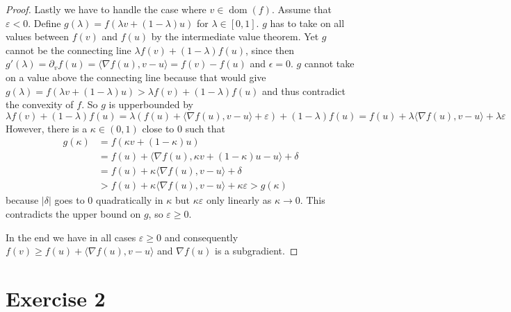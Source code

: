 \documentclass[10pt,a4paper]{article}
\DeclareMathOperator{\dom}{dom}
\begin{document}
\begin{proof}
  Lastly we have to handle the case where $v \in \dom(f)$.
  Assume that $\varepsilon < 0$.
  Define $g(\lambda) = f(\lambda v + (1 - \lambda)u)$ for $\lambda \in [0, 1]$.
  $g$ has to take on all values between $f(v)$ and $f(u)$ by the intermediate value theorem.
  Yet $g$ cannot be the connecting line $\lambda f(v) + (1 - \lambda) f(u)$, since then $g'(\lambda) = \partial_{v} f(u) = \langle \nabla f(u), v - u \rangle = f(v) - f(u)$ and $\epsilon = 0$.
  $g$ cannot take on a value above the connecting line because that would give $g(\lambda) = f(\lambda v + (1 - \lambda)u) > \lambda f(v) + (1 - \lambda) f(u)$ and thus contradict the convexity of $f$.
  So $g$ is upperbounded by
  \begin{equation*}
    \lambda f(v) + (1 - \lambda) f(u) = \lambda(f(u) + \langle \nabla f(u), v - u \rangle + \varepsilon) + (1 - \lambda)f(u) = f(u) + \lambda\langle \nabla f(u), v - u \rangle + \lambda\varepsilon
  \end{equation*}
  However, there is a $\kappa \in (0, 1)$ close to $0$ such that
  \begin{align*}
    g(\kappa) & = f(\kappa v + (1 - \kappa)u)\\
              & = f(u) + \langle \nabla f(u), \kappa v + (1 - \kappa)u - u \rangle + \delta\\
              & = f(u) + \kappa\langle \nabla f(u), v - u \rangle + \delta\\
              & > f(u) + \kappa\langle \nabla f(u), v - u \rangle + \kappa\varepsilon > g(\kappa)
  \end{align*}
  because $|\delta|$ goes to $0$ quadratically in $\kappa$ but $\kappa\varepsilon$ only linearly as $\kappa \rightarrow 0$.
  This contradicts the upper bound on $g$, so $\varepsilon \ge 0$.

  In the end we have in all cases $\varepsilon \ge 0$ and consequently $f(v) \ge f(u) + \langle \nabla f(u), v - u \rangle$ and $\nabla f(u)$ is a subgradient.
\end{proof}

\section*{Exercise 2}
\end{document}
